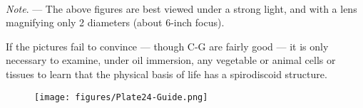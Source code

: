 \documentclass[a4paper, 12pt, oneside]{article}
\begin{document}
\paragraph{}
\emph{Note}. --- The above figures are best viewed under a strong light, and with a lens magnifying only 2 diameters (about 6-inch focus).

If the pictures fail to convince --- though C-G are fairly good --- it is only necessary to examine, under oil immersion, any vegetable or animal cells or tissues to learn that the physical basis of life has a spirodiscoid structure.
\clearpage
\begin{figure}[b]
\centering
\texttt{[image: figures/Plate24-Guide.png]}
\caption*{}
\end{figure}
\clearpage
\pagestyle{fancy}
\fancyhf{}
\rhead{}
\cfoot{\Fontauri{\thepage}}
\printindex
\clearpage
\end{document}
